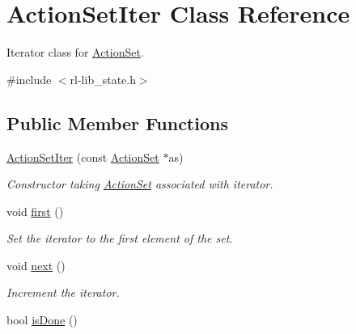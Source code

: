 \hypertarget{classActionSetIter}{\section{Action\-Set\-Iter Class Reference}
\label{classActionSetIter}
}


Iterator class for \hyperlink{classActionSet}{Action\-Set}.  




{\ttfamily \#include $<$rl-\/lib\-\_\-state.\-h$>$}

\subsection*{Public Member Functions}
\begin{DoxyCompactItemize}
\item 
\hyperlink{classActionSetIter_a7e0b7dae76dd05e57de36d17ea410edb}{Action\-Set\-Iter} (const \hyperlink{classActionSet}{Action\-Set} $\ast$as)
\begin{DoxyCompactList}\small\item\em Constructor taking \hyperlink{classActionSet}{Action\-Set} associated with iterator. \end{DoxyCompactList}\item 
\hypertarget{classActionSetIter_aa0f694797b7003987ce46624ad756b14}{void \hyperlink{classActionSetIter_aa0f694797b7003987ce46624ad756b14}{first} ()}\label{classActionSetIter_aa0f694797b7003987ce46624ad756b14}

\begin{DoxyCompactList}\small\item\em Set the iterator to the first element of the set. \end{DoxyCompactList}\item 
\hypertarget{classActionSetIter_a5aab0600528fb3af00d1b3b0d8cfd673}{void \hyperlink{classActionSetIter_a5aab0600528fb3af00d1b3b0d8cfd673}{next} ()}\label{classActionSetIter_a5aab0600528fb3af00d1b3b0d8cfd673}

\begin{DoxyCompactList}\small\item\em Increment the iterator. \end{DoxyCompactList}\item 
\hypertarget{classActionSetIter_a7df2acfbd850b7e36c2a9a5884fb6d3a}{bool \hyperlink{classActionSetIter_a7df2acfbd850b7e36c2a9a5884fb6d3a}{is\-Done} ()}\label{classActionSetIter_a7df2acfbd850b7e36c2a9a5884fb6d3a}


\end{DoxyCompactItemize}
